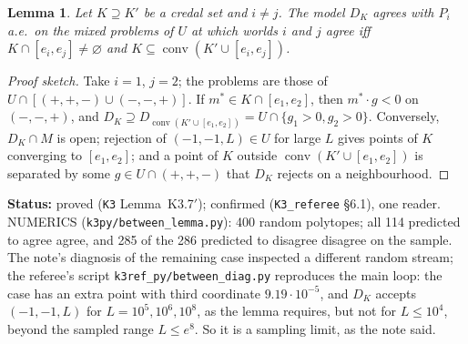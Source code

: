 \documentclass[11pt]{article}
\newtheorem{lemma}[theorem]{Lemma}
\theoremstyle{definition}
\theoremstyle{remark}
\newcommand{\co}{\operatorname{conv}}
\newcommand{\src}[1]{\texttt{#1}}
\newcommand{\status}[1]{\par\smallskip\noindent\textbf{Status:} #1\par\smallskip}
\begin{document}
\begin{lemma}\label{lem:K37p}
Let $K\supseteq K'$ be a credal set and $i\ne j$. The model $D_K$ agrees with $P_i$ a.e.\ on the mixed problems of $U$ at which worlds $i$ and $j$ agree iff $K\cap[e_i,e_j]\ne\varnothing$ and $K\subseteq\co(K'\cup[e_i,e_j])$.
\end{lemma}
\begin{proof}[Proof sketch]
Take $i=1$, $j=2$; the problems are those of $U\cap[(+,+,-)\cup(-,-,+)]$. If $m^*\in K\cap[e_1,e_2]$, then $m^*\cdot g<0$ on $(-,-,+)$, and $D_K\supseteq D_{\co(K'\cup[e_1,e_2])}=U\cap\{g_1>0,g_2>0\}$. Conversely, $D_K\cap M$ is open; rejection of $(-1,-1,L)\in U$ for large $L$ gives points of $K$ converging to $[e_1,e_2]$; and a point of $K$ outside $\co(K'\cup[e_1,e_2])$ is separated by some $g\in U\cap(+,+,-)$ that $D_K$ rejects on a neighbourhood.
\end{proof}
\status{proved (\src{K3} Lemma~K3.7$'$); confirmed (\src{K3\_referee} \S6.1), one reader. NUMERICS (\src{k3py/between\_lemma.py}): 400 random polytopes; all 114 predicted to agree agree, and 285 of the 286 predicted to disagree disagree on the sample. The note's diagnosis of the remaining case inspected a different random stream; the referee's script \src{k3ref\_py/between\_diag.py} reproduces the main loop: the case has an extra point with third coordinate $9.19\cdot10^{-5}$, and $D_K$ accepts $(-1,-1,L)$ for $L=10^5,10^6,10^8$, as the lemma requires, but not for $L\le10^4$, beyond the sampled range $L\le e^8$. So it is a sampling limit, as the note said.}
\end{document}
